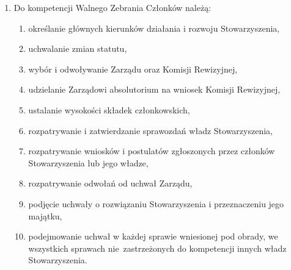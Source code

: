 \documentclass[chapterprefix,notitlepage]{article}
\begin{document}
\begin{enumerate}
	\item Do kompetencji Walnego Zebrania Członków należą:
	\begin{enumerate}[1)]
	\item określanie głównych kierunków działania i rozwoju Stowarzyszenia,
	\item uchwalanie zmian statutu,
	\item wybór i odwoływanie Zarządu oraz Komisji Rewizyjnej,
	\item udzielanie Zarządowi absolutorium na wniosek Komisji Rewizyjnej,
	\item ustalanie wysokości składek członkowskich,
	\item rozpatrywanie i zatwierdzanie sprawozdań władz Stowarzyszenia,
	\item rozpatrywanie wniosków i postulatów zgłoszonych przez członków Stowarzyszenia lub jego władze,
	\item rozpatrywanie odwołań od uchwał Zarządu,
	\item podjęcie uchwały o rozwiązaniu Stowarzyszenia i przeznaczeniu jego majątku,
	\item podejmowanie uchwał w każdej sprawie wniesionej pod obrady, we wszystkich sprawach nie~zastrzeżonych do kompetencji innych władz Stowarzyszenia.
	\end{enumerate}
	

\end{enumerate}
\end{document}
